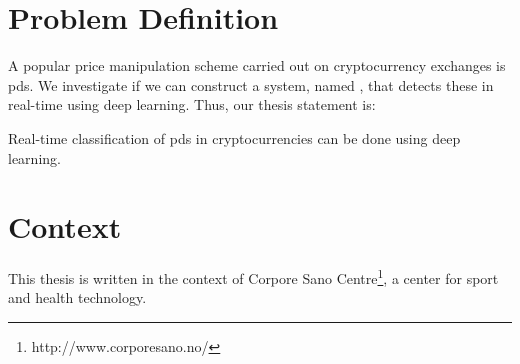 


\section{Problem Definition}\label{sec:problem_definition}
A popular price manipulation scheme carried out on cryptocurrency exchanges is \acp{pd}. We investigate if we can construct a system, named \project, that detects these in real-time using deep learning. Thus, our thesis statement is:

\begin{displayquote}
    \begin{em}
    Real-time classification of \acfp{pd} in cryptocurrencies can be done using deep learning.
    \end{em}
\end{displayquote}

\section{Context}\label{sec:context}
This thesis is written in the context of Corpore Sano Centre\footnote{http://www.corporesano.no/}, a center for sport and health technology.

